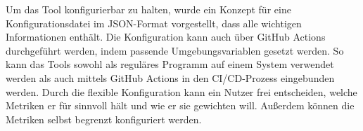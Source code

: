 Um das Tool konfigurierbar zu halten, wurde ein Konzept für eine Konfigurationsdatei im \ac{JSON}-Format vorgestellt, dass alle wichtigen Informationen enthält. Die Konfiguration kann auch über GitHub Actions durchgeführt werden, indem passende Umgebungsvariablen gesetzt werden.  So kann das Tools sowohl als reguläres Programm auf einem System verwendet werden als auch mittels GitHub Actions in den \ac{CI/CD}-Prozess eingebunden werden. Durch die flexible Konfiguration kann ein Nutzer frei entscheiden, welche Metriken er für sinnvoll hält und wie er sie gewichten will.  Außerdem können die Metriken selbst begrenzt konfiguriert werden. 
